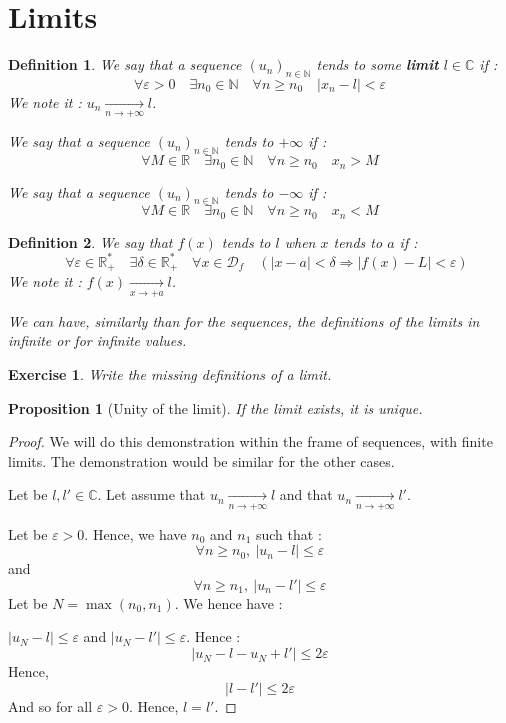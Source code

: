 \documentclass[french,12pt,a4paper]{book}
\newcommand{\N}{\mathbb{N}}
\newcommand{\R}{\mathbb{R}}
\newcommand{\C}{\mathbb{C}}
\newtheorem{exo}{Exercise}[chapter]
\newtheorem{defin}{Definition}[chapter]
\newtheorem{prop}{Proposition}[chapter]
\numberwithin{equation}{chapter}
\begin{document}
\section{Limits}

\begin{defin}
We say that a sequence $(u_n)_{n \in \N}$ tends to some \textbf{limit} $l \in \C$ if :
$$\forall \varepsilon>0\quad\exists n_0 \in \N \quad\forall n \geq n_0\quad|{x_n - l}| < \varepsilon $$
We note it : $u_n \underset{n \rightarrow + \infty}{ \longrightarrow} l$.

We say that a sequence $(u_n)_{n \in \N}$ tends to $+ \infty$ if : 
$$ \forall M\in\R\quad\exists n_0 \in \N \quad\forall n \geq n_0\quad x_n > M $$

We say that a sequence $(u_n)_{n \in \N}$ tends to $- \infty$ if : 
$$\forall M\in\R\quad\exists n_0 \in \N\quad\forall n \geq n_0\quad x_n < M$$
\end{defin}

\begin{defin}
We say that $f(x)$ tends to $l$ when $x$ tends to $a$ if :
$$\quad\forall \varepsilon \in \R_+^*\quad\exists \delta \in \R_+^*\quad\forall x \in \mathcal D_f\quad(|{x - a}| < \delta \Rightarrow |f(x)-L|<\varepsilon)$$
We note it : $f(x) \underset{x \rightarrow +a}{ \longrightarrow} l$.

We can have, similarly than for the sequences, the definitions of the limits in infinite or for infinite values. 
\end{defin}

\begin{exo}
Write the missing definitions of a limit.
\end{exo}

\begin{prop}[Unity of the limit]
If the limit exists, it is unique. 
\end{prop}

\begin{proof}
We will do this demonstration within the frame of sequences, with finite limits. The demonstration would be similar for the other cases. 

Let be $l, l' \in \C$. Let assume that $u_n \underset{n \rightarrow + \infty}{ \longrightarrow} l$ and that $u_n \underset{n \rightarrow + \infty}{ \longrightarrow} l'$. 

Let be $\varepsilon > 0$. Hence, we have $n_0$ and $n_1$ such that : 
$$ \forall n \geq n_0, \ |u_n - l| \leq \varepsilon$$
and 
$$ \forall n \geq n_1, \ |u_n - l'| \leq \varepsilon$$
Let be $N = \max (n_0, n_1)$. We hence have : 

$|u_N - l| \leq \varepsilon$ and $|u_N - l'| \leq \varepsilon$. Hence :
$$| u_N -l - u_N + l'| \leq 2 \varepsilon$$
Hence, 
$$| l - l'| \leq 2 \varepsilon$$
And so for all $\varepsilon > 0$. Hence, $l = l'$.
\end{proof}
\end{document}

